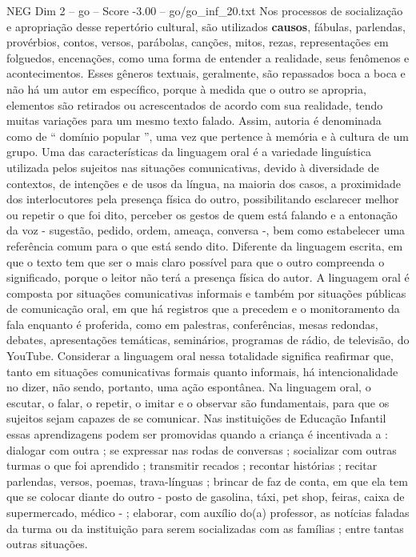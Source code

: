 \begin{textsample}{NEG Dim 2 – go – Score -3.00 – go/go\_inf\_20.txt}
Nos processos de socialização e apropriação desse repertório cultural, são utilizados \textbf{causos}, fábulas, parlendas, provérbios, contos, versos, parábolas, canções, mitos, rezas, representações em folguedos, encenações, como uma forma de entender a realidade, seus fenômenos e acontecimentos.
Esses gêneros textuais, geralmente, são repassados boca a boca e não há um autor em específico, porque à medida que o outro se apropria, elementos são retirados ou acrescentados de acordo com sua realidade, tendo muitas variações para um mesmo texto falado.
Assim, autoria é denominada como de “ domínio popular ”, uma vez que pertence à memória e à cultura de um grupo.
Uma das características da linguagem oral é a variedade linguística utilizada pelos sujeitos nas situações comunicativas, devido à diversidade de contextos, de intenções e de usos da língua, na maioria dos casos, a proximidade dos interlocutores pela presença física do outro, possibilitando esclarecer melhor ou repetir o que foi dito, perceber os gestos de quem está falando e a entonação da voz - sugestão, pedido, ordem, ameaça, conversa -, bem como estabelecer uma referência comum para o que está sendo dito.
Diferente da linguagem escrita, em que o texto tem que ser o mais claro possível para que o outro compreenda o significado, porque o leitor não terá a presença física do autor.
A linguagem oral é composta por situações comunicativas informais e também por situações públicas de comunicação oral, em que há registros que a precedem e o monitoramento da fala enquanto é proferida, como em palestras, conferências, mesas redondas, debates, apresentações temáticas, seminários, programas de rádio, de televisão, do YouTube.
Considerar a linguagem oral nessa totalidade significa reafirmar que, tanto em situações comunicativas formais quanto informais, há intencionalidade no dizer, não sendo, portanto, uma ação espontânea.
Na linguagem oral, o escutar, o falar, o repetir, o imitar e o observar são fundamentais, para que os sujeitos sejam capazes de se comunicar.
Nas instituições de Educação Infantil essas aprendizagens podem ser promovidas quando a criança é incentivada a : dialogar com outra ; se expressar nas rodas de conversas ; socializar com outras turmas o que foi aprendido ; transmitir recados ; recontar histórias ; recitar parlendas, versos, poemas, trava-línguas ; brincar de faz de conta, em que ela tem que se colocar diante do outro - posto de gasolina, táxi, pet shop, feiras, caixa de supermercado, médico - ; elaborar, com auxílio do(a) professor, as notícias faladas da turma ou da instituição para serem socializadas com as famílias ; entre tantas outras situações.

\end{textsample}
